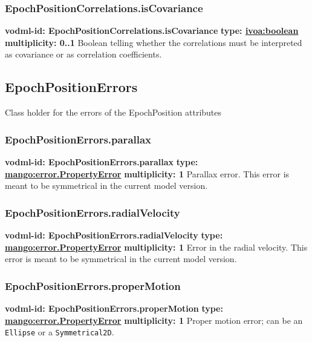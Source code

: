     \subsubsection{EpochPositionCorrelations.isCovariance}
    \textbf{vodml-id: EpochPositionCorrelations.isCovariance} \newline
    \textbf{type: \hyperref[sect:ivoa]{ivoa:boolean}} \newline
    \textbf{multiplicity: 0..1} \newline
    Boolean telling whether the correlations must be interpreted as covariance or as correlation coefficients.

  \subsection{EpochPositionErrors}
    \label{sect:EpochPositionErrors}
    Class holder for the errors of the EpochPosition attributes

    \subsubsection{EpochPositionErrors.parallax}
    \textbf{vodml-id: EpochPositionErrors.parallax} \newline
    \textbf{type: \hyperref[sect:error.PropertyError]{mango:error.PropertyError}} \newline
    \textbf{multiplicity: 1} \newline
    Parallax error. This error is meant to be symmetrical in the current model version.

    \subsubsection{EpochPositionErrors.radialVelocity}
    \textbf{vodml-id: EpochPositionErrors.radialVelocity} \newline
    \textbf{type: \hyperref[sect:error.PropertyError]{mango:error.PropertyError}} \newline
    \textbf{multiplicity: 1} \newline
    Error in the radial velocity. This error is meant to be symmetrical in the current model version.

    \subsubsection{EpochPositionErrors.properMotion}
    \textbf{vodml-id: EpochPositionErrors.properMotion} \newline
    \textbf{type: \hyperref[sect:error.PropertyError]{mango:error.PropertyError}} \newline
    \textbf{multiplicity: 1} \newline
    Proper motion error; can be an \texttt{Ellipse} or a \texttt{Symmetrical2D}.

